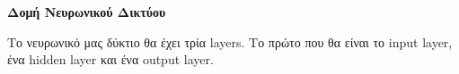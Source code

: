 \documentclass[a4paper,12pt]{article}
\begin{document}
\begin{titlepage} 
    \centering
    \vspace{1cm} 
    \tableofcontents
    \vfill 
\end{titlepage}
\clearpage
\markright{}
\fancyhead[R]{\nouppercase{\rightmark}}  

\fancyfoot[C]{\thepage}  

\renewcommand{\sectionmark}[1]{\markright{\thesection\ #1}}




\section*{}
\begin{center}
    \Large \textbf{Δομή Νευρωνικού Δικτύου}
\end{center}

Το νευρωνικό μας δύκτιο θα έχει τρία layers. Το πρώτο που θα είναι το input layer, ένα hidden layer και ένα output layer.
\end{document}

